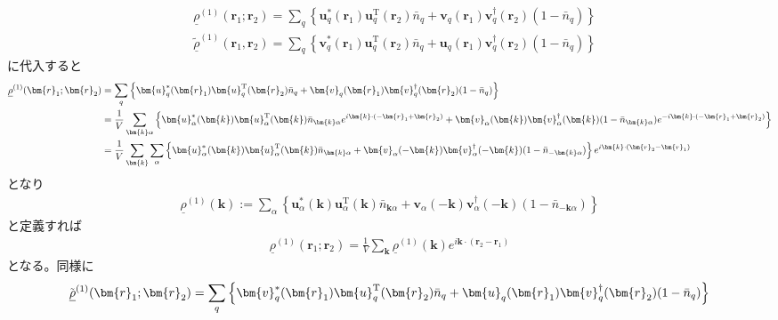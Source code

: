 \documentclass[dvipdfmx, 11pt, a4paper]{jsarticle}
\numberwithin{equation}{section}
\theoremstyle{definition}
\begin{document}
    \begin{derivationBox}
        \begin{align}
            &\underline{\rho}^{(1)}(\bm{r}_1;\bm{r}_2)  
            = \sum_q\left\{ \bm{u}_q^*(\bm{r}_1)\bm{u}_q^{\mathrm{T}}(\bm{r}_2)\bar{n}_q+\bm{v}_q(\bm{r}_1)\bm{v}_q^\dagger(\bm{r}_2)(1-\bar{n}_q) \right\}   \\
            &\underline{\tilde{\rho}}^{(1)}(\bm{r}_1,\bm{r}_2) 
            = \sum_q \left\{ \bm{v}^*_q(\bm{r}_1)\bm{u}_q^\mathrm{T}(\bm{r}_2)\bar{n}_q + \bm{u}_q(\bm{r}_1) \bm{v}^\dagger_q(\bm{r}_2) (1-\bar{n}_q)\right\} 
        \end{align}
        に代入すると
        \begin{align}
            \underline{\rho}^{(1)}(\bm{r}_1;\bm{r}_2)  
            &= \sum_q\left\{ \bm{u}_q^*(\bm{r}_1)\bm{u}_q^{\mathrm{T}}(\bm{r}_2)\bar{n}_q+\bm{v}_q(\bm{r}_1)\bm{v}_q^\dagger(\bm{r}_2)(1-\bar{n}_q) \right\}  \notag \\
            &= \frac{1}{V}\sum_{\bm{k}\alpha} \left\{ \bm{u}_\alpha^*(\bm{k})\bm{u}_\alpha^{\mathrm{T}}(\bm{k})\bar{n}_{\bm{k}\alpha} e^{i\bm{k}\cdot(-\bm{r}_1 + \bm{r}_2)}+\bm{v}_\alpha(\bm{k})\bm{v}_\alpha^\dagger(\bm{k})(1-\bar{n}_{\bm{k}\alpha}) e^{-i\bm{k}\cdot(-\bm{r}_1 + \bm{r}_2)} \right\} \notag \\
            &= \frac{1}{V}\sum_{\bm{k}} \sum_{\alpha} \left\{ \bm{u}_\alpha^*(\bm{k})\bm{u}_\alpha^{\mathrm{T}}(\bm{k})\bar{n}_{\bm{k}\alpha} +\bm{v}_\alpha(-\bm{k})\bm{v}_\alpha^\dagger(-\bm{k})(1-\bar{n}_{-\bm{k}\alpha})  \right\} e^{i\bm{k}\cdot(\bm{r}_2 - \bm{r}_1)}
        \end{align}
        となり
        \begin{align}
            \underline{\rho}^{(1)}(\bm{k}) := \sum_{\alpha} \left\{ \bm{u}_\alpha^*(\bm{k})\bm{u}_\alpha^{\mathrm{T}}(\bm{k})\bar{n}_{\bm{k}\alpha} +\bm{v}_\alpha(-\bm{k})\bm{v}_\alpha^\dagger(-\bm{k})(1-\bar{n}_{-\bm{k}\alpha})  \right\} 
        \end{align}
        と定義すれば
        \begin{align}
            \underline{\rho}^{(1)}(\bm{r}_1;\bm{r}_2) = \frac{1}{V}\sum_{\bm{k}} \underline{\rho}^{(1)}(\bm{k}) e^{i\bm{k}\cdot(\bm{r}_2 - \bm{r}_1)}
        \end{align}
        となる。同様に
        \begin{align}
            \tilde{\underline{\rho}}^{(1)}(\bm{r}_1;\bm{r}_2)  
            &= \sum_q\left\{ \bm{v}_q^*(\bm{r}_1)\bm{u}_q^{\mathrm{T}}(\bm{r}_2)\bar{n}_q+\bm{u}_q(\bm{r}_1)\bm{v}_q^\dagger(\bm{r}_2)(1-\bar{n}_q) \right\}  \notag \\

\end{align}
\end{derivationBox}
\end{document}
